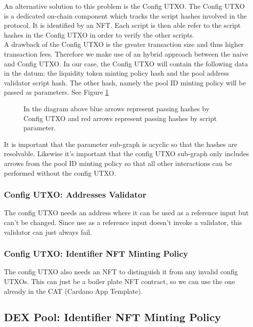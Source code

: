 \documentclass{article}
\begin{document}
An alternative solution to this problem is the Config UTXO.
The Config UTXO is a dedicated on-chain component which tracks the script hashes involved in the protocol.
It is identified by an NFT. Each script is then able refer to the script
hashes in the Config UTXO in order to verify the other
scripts. \\

A drawback of the Config UTXO is the greater transaction size and thus higher transaction fees.
Therefore we make use of an hybrid approach between the naive and Config UTXO.
In our case, the Config UTXO will contain the following data in the datum:
the liquidity token minting policy hash and the pool address validator script hash.
The other hash, namely the pool ID minting policy will be passed as parameters. See Figure \ref{hashGraph}  \\

\begin{figure}
  \caption{
	  In the diagram above blue arrows represent passing hashes by
	  Config UTXO and red arrows represent passing hashes by script parameter.
  }
  \label{hashGraph}
\end{figure}

It is important that the parameter sub-graph is acyclic so that
the hashes are resolvable. Likewise it's important that
the config UTXO sub-graph only includes arrows from the pool ID minting policy
so that all other interactions can be performed without the config UTXO.


\subsubsection{Config UTXO: Addresses Validator}

The config UTXO needs an address where it can be used as a reference
input but can't be changed. Since use as a reference input doesn't
invoke a validator, this validator can just always fail.

\subsubsection{Config UTXO: Identifier NFT Minting Policy}

The config UTXO also needs an NFT to distinguish it from any
invalid config UTXOs. This can just be a boiler plate NFT contract,
so we can use the one already in the CAT (Cardano App Template).

\subsection{DEX Pool: Identifier NFT Minting Policy}
\end{document}
